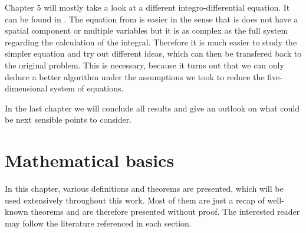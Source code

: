 \documentclass[12pt,a4paper,twoside, open=right]{scrreprt}
\theoremstyle{definition}
\theoremstyle{plain}
\begin{document}
\par
Chapter 5 will mostly take a look at a different integro-differential equation. It can be found in \cite{Goetze1995}. The equation from \cite{Goetze1995} is easier in the sense that is does not have a spatial component or multiple variables but it is as complex as the full system regarding the calculation of the integral. Therefore it is much easier to study the simpler equation and try out different ideas, which can then be transfered back to the original problem. This is necessary, because it turns out that we can only deduce a better algorithm under the assumptions we took to reduce the five-dimensional system of equations. \par
In the last chapter we will conclude all results and give an outlook on what could be next sensible points to consider.
\newpage
\chapter{Mathematical basics}
In this chapter, various definitions and theorems are presented, which will be used extensively throughout this work. Most of them are just a recap of well-known theorems and are therefore presented without proof. The interested reader may follow the literature referenced in each section.
\end{document}

